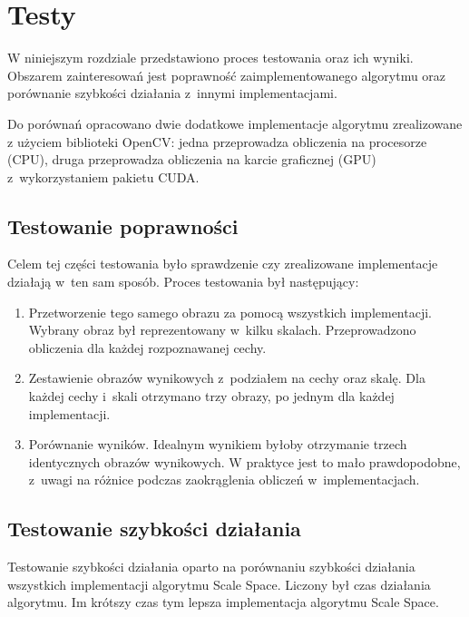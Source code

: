 \chapter{Testy}
\label{cha:testy}

W niniejszym rozdziale przedstawiono proces testowania oraz ich wyniki. Obszarem zainteresowań jest poprawność zaimplementowanego algorytmu oraz porównanie szybkości działania z~innymi implementacjami.

Do porównań opracowano dwie dodatkowe implementacje algorytmu zrealizowane z użyciem biblioteki OpenCV: jedna przeprowadza obliczenia na procesorze (CPU), druga przeprowadza obliczenia na karcie graficznej (GPU) z~wykorzystaniem pakietu CUDA.

\section{Testowanie poprawności}
\label{sec:testPoprawnosc}

Celem tej części testowania było sprawdzenie czy zrealizowane implementacje działają w~ten sam sposób. Proces testowania był następujący:
\begin{enumerate}
\item Przetworzenie tego samego obrazu za pomocą wszystkich implementacji. Wybrany obraz był reprezentowany w~kilku skalach. Przeprowadzono obliczenia dla każdej rozpoznawanej cechy.
\item Zestawienie obrazów wynikowych z~podziałem na cechy oraz skalę. Dla każdej cechy i~skali otrzymano trzy obrazy, po jednym dla każdej implementacji.
\item Porównanie wyników. Idealnym wynikiem byłoby otrzymanie trzech identycznych obrazów wynikowych. W praktyce jest to mało prawdopodobne, z~uwagi na różnice podczas zaokrąglenia obliczeń w~implementacjach.
\end{enumerate}




\section{Testowanie szybkości działania}
\label{sec:testSzybkosc1}

Testowanie szybkości działania oparto na porównaniu szybkości działania wszystkich implementacji algorytmu Scale Space. Liczony był czas działania algorytmu. Im krótszy czas tym lepsza implementacja algorytmu Scale Space.

